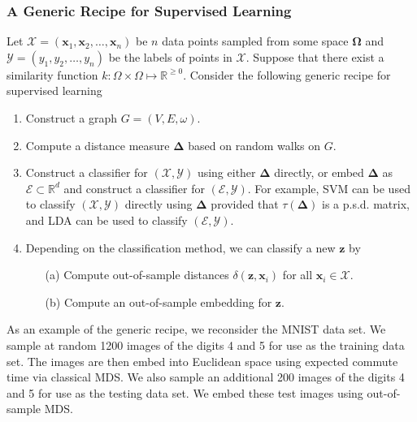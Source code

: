 \documentclass[professionalfonts, hyperref={pdfpagelabels=false,
  colorlinks=true, linkcolor=purple}]{beamer}
\begin{document}
\begin{frame}
  \frametitle{A Generic Recipe for Supervised Learning}
  Let $\mathcal{X} = (\mathbf{x}_1, \mathbf{x}_2, \dots,
  \mathbf{x}_n)$ be $n$ data points sampled from some space
  $\bm{\Omega}$ and $\mathcal{Y} = (y_1, y_2, \dots, y_n)$ be the
  labels of points in $\mathcal{X}$. Suppose that there exist a
  similarity function $k \colon \Omega \times \Omega \mapsto
  \mathbb{R}^{\geq 0}$. Consider the following generic recipe for
  supervised learning
  \begin{enumerate}
  \item Construct a graph $G = (V,E,\omega)$.
  \item Compute a distance measure $\bm{\Delta}$ based on random walks
    on $G$.
  \item Construct a classifier for $(\mathcal{X}, \mathcal{Y})$ using
    either $\bm{\Delta}$ directly, or embed $\bm{\Delta}$ as
    $\mathcal{E} \subset \mathbb{R}^{d}$ and construct a classifier
    for $(\mathcal{E}, \mathcal{Y})$. For example, SVM can be used to
    classify $(\mathcal{X}, \mathcal{Y})$ directly using $\bm{\Delta}$
    provided that $\tau(\bm{\Delta})$ is a p.s.d. matrix, and LDA can
    be used to classify $(\mathcal{E}, \mathcal{Y})$. 
  \item Depending on the classification method, we can classify a new
    $\mathbf{z}$ by
    \begin{enumerate}
    \item[(a)] Compute out-of-sample distances 
      $\delta(\mathbf{z},\mathbf{x}_i)$ for all $\mathbf{x}_i \in
      \mathcal{X}$.
    \item[(b)] Compute an out-of-sample embedding \cite{trosset08,bengio04:_out_lle_isomap_mds_eigen} for $\mathbf{z}$.
    \end{enumerate}
  \end{enumerate}
\end{frame}

\begin{frame}[label=out_of_sample_mnist]
  As an example of the generic recipe, we reconsider the MNIST data
  set. We sample at random 1200 images of the digits 4 and 5 for use
  as the training data set. The images are then embed into Euclidean
  space using expected commute time via classical MDS. We also sample
  an additional 200 images of the digits 4 and 5 for use as the
  testing data set. We embed these test images using out-of-sample
  MDS. 
  \begin{figure}[htbp]
    \begin{center}
      \hyperlink{fig:out_of_sample_mnist}{}
    \end{center}
  \end{figure}    
\end{frame}
\end{document}
